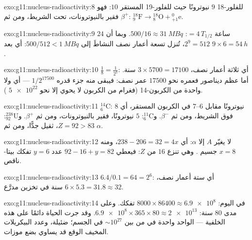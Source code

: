 \begin{solution}{exo:g11:nucleus-radioactivity:8}
للفلور-18 $9$ نيوترونًا حيث للفلور-19 المستقر $10$:
فهو فقير بالنيوترونات، تحت الشريط، ومن ثم $\beta^+$:
${}^{18}_{9}\mathrm{F} \to {}^{18}_{8}\mathrm{O} + {}^{0}_{+1}\mathrm{e}$.
\end{solution}

\begin{solution}{exo:g11:nucleus-radioactivity:9}
$24$ ساعة $= 4\,T_{1/2}$: $500/16 \approx \qty{31}{MBq}$. وبما أن
$2^9 = 512$، تُنزل تسعة أعمار نصف النشاطَ إلى $500/512 < \qty{1}{MBq}$: أي بعد
$9 \times 6 = \qty{54}{h}$.
\end{solution}

\begin{solution}{exo:g11:nucleus-radioactivity:10}
$\frac18 = \frac1{2^3}$: أي ثلاثة أعمار نصف، $3 \times \num{5700} =
\num{17100}$ سنة. أما عظم ديناصور فعمره نحو $\num{17500}$ عمر نصف:
فيبقى منه جزء قدره $1/2^{17500}$ --- أي ولا  واحدة من الكربون-14 (فغرام من
الكربون لا يحوي إلا نحو $\num{5e22}$ ).
\end{solution}

\begin{solution}{exo:g11:nucleus-radioactivity:11}
${}^{14}_{6}\mathrm{C}$: $8$ نيوترونًا مقابل $6$--$7$ في الكربون المستقر،
أي فوق الشريط، ومن ثم $\beta^-$. و${}^{11}_{6}\mathrm{C}$: $5$ نيوترونًا،
فقير بالنيوترونات، ومن ثم $\beta^+$. و${}^{238}_{92}\mathrm{U}$: $Z = 92 > 83$، ثقيل
جدًّا، ومن ثم $\alpha$.
\end{solution}

\begin{solution}{exo:g11:nucleus-radioactivity:12}
لا يغيّر $A$ إلا $\alpha$: أي $238 - 206 = 32 = 4x$، ومنه $x = 8$ جسيم . وهي
تنزع $16$ من $Z$: فيعطي $92 - 16 + y = 82$ عدد $y = 6$ تفكك بيتا-ناقص.
\end{solution}

\begin{solution}{exo:g11:nucleus-radioactivity:13}
$6.4/0.1 = 64 = 2^{6}$: أي ستة أعمار نصف، $6 \times 5.3 = 31.8 \approx 32$
سنة في تخزين مدرَّع.
\end{solution}

\begin{solution}{exo:g11:nucleus-radioactivity:14}
في اليوم: $8000 \times 86400 \approx \num{6.9e8}$ تفكك. وعلى مدى $80$ سنة:
$\num{6.9e8} \times 365 \times 80 \approx \num{2e13}$. وقد جرت الحياة دائمًا
على هذه الخلفية ---  الواحد  واحدة في  من بين
$\sim 10^{27}$ في الجسم؛  ضئيلة، وعدد البيكريلات المخيف
الوقع قد يساوي بضع موزات.
\end{solution}

